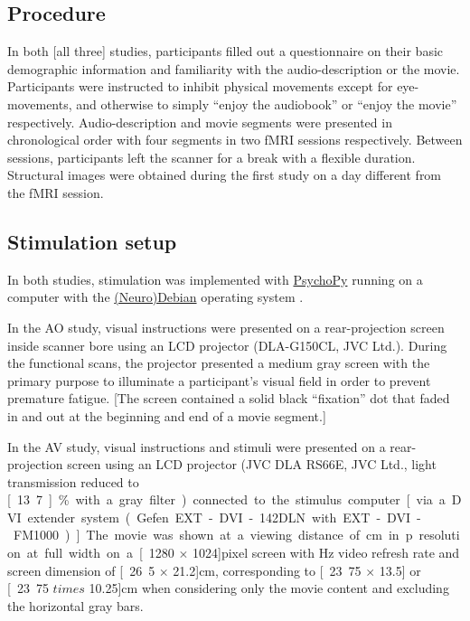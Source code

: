 \documentclass[english]{article}
\begin{document}
\subsection{Procedure}

In both [all three] studies, participants filled out a questionnaire on their
basic demographic information and familiarity with the audio-description or the
movie. Participants were instructed to inhibit physical movements except for
eye-movements, and otherwise to simply ``enjoy the audiobook'' or ``enjoy the
movie'' respectively. Audio-description and movie segments were presented in
chronological order with four segments in two fMRI sessions respectively.
Between sessions, participants left the scanner for a break with a flexible
duration. Structural images were obtained during the first study on a day
different from the fMRI session.


\subsection{Stimulation setup}

In both studies, stimulation was implemented with \href{http://www.psychopy.org}{PsychoPy} \citep{peirce2007psychopy} running on a computer with the \href{http://neuro.debian.net}{(Neuro)Debian} operating system \citep{halchenko2012open}.

In the AO study, visual instructions were presented on a rear-projection screen
inside scanner bore using an LCD projector (DLA-G150CL, JVC Ltd.). During the
functional scans, the projector presented a medium gray screen with the primary
purpose to illuminate a participant's visual field in order to prevent premature
fatigue. [The screen contained a solid black ``fixation'' dot that faded in and
out at the beginning and end of a movie segment.]

In the AV study, visual instructions and stimuli were presented on a
rear-projection screen using an LCD projector (JVC DLA RS66E, JVC Ltd., light
transmission reduced to \unit[13.7]{\%} with a gray filter) connected to the
stimulus computer [via a DVI extender system (Gefen EXT-DVI-142DLN with
EXT-DVI-FM1000)]. The movie was shown at a viewing distance of \unit[63]{cm} in
\unit[720]{p} resolution at full width on a \unit[1280 $\times$ 1024]{pixel}
screen with \unit[60]{Hz} video refresh rate and screen dimension of \unit[26.5
$\times$ 21.2]{cm}, corresponding to \unit[23.75 $\times$ 13.5] or \unit[23.75
$times$ 10.25]{cm} when considering only the movie content and excluding the
horizontal gray bars.
\end{document}
